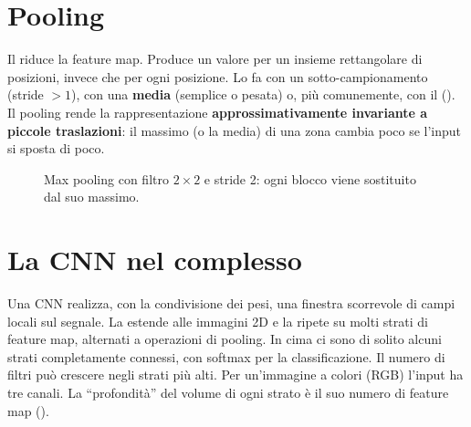 \section{Pooling}

Il  riduce la feature map. Produce un valore per un insieme rettangolare di posizioni, invece che
per ogni posizione. Lo fa con un sotto-campionamento (stride $>1$), con una \textbf{media} (semplice o pesata) o,
più comunemente, con il  (). Il pooling rende la rappresentazione
\textbf{approssimativamente invariante a piccole traslazioni}: il massimo (o la media) di una zona cambia poco se
l'input si sposta di poco.

\begin{figure}[ht]
\centering
{}
\caption{Max pooling con filtro $2\times2$ e stride 2: ogni blocco viene sostituito dal suo massimo.}
\label{fig:maxpool}
\end{figure}

\section{La CNN nel complesso}

Una CNN realizza, con la condivisione dei pesi, una finestra scorrevole di campi locali sul segnale. La estende
alle immagini 2D e la ripete su molti strati di feature map, alternati a operazioni di pooling. In cima ci sono di
solito alcuni strati completamente connessi, con softmax per la classificazione. Il numero di filtri può crescere
negli strati più alti. Per un'immagine a colori (RGB) l'input ha tre canali. La ``profondità'' del volume di ogni
strato è il suo numero di feature map ().

